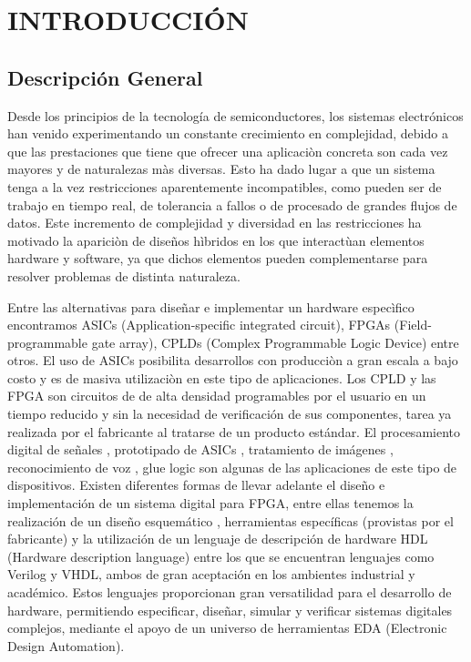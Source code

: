 \chapter{INTRODUCCIÓN}


\section{Descripción General}

Desde los principios de la tecnología de semiconductores, los sistemas
electrónicos han venido experimentando un constante crecimiento en complejidad,
debido a que las prestaciones que tiene que ofrecer una aplicaciòn concreta son
cada vez mayores y de naturalezas màs diversas. Esto ha dado lugar a que un
sistema  tenga a la vez restricciones aparentemente incompatibles, como pueden
ser de trabajo en tiempo real, de tolerancia a fallos o de procesado de grandes
flujos de datos. Este incremento de complejidad y diversidad en las
restricciones ha motivado la apariciòn de diseños hìbridos en los que
interactùan elementos hardware y software, ya que dichos elementos pueden
complementarse para resolver problemas de distinta naturaleza.


Entre las alternativas para diseñar e implementar un hardware especìfico
encontramos ASICs  (Application-specific integrated circuit), FPGAs
(Field-programmable gate array), CPLDs (Complex Programmable Logic Device)
entre otros. El uso de ASICs posibilita desarrollos con producciòn a gran
escala a bajo costo y es de masiva utilizaciòn en este tipo de aplicaciones.
Los  CPLD  y las FPGA son circuitos de de alta densidad programables por el
usuario en un tiempo reducido y sin la necesidad de verificación de sus
componentes, tarea ya realizada por el fabricante al tratarse de un producto
estándar. El procesamiento digital de señales , prototipado de ASICs ,
tratamiento de imágenes , reconocimiento de voz , glue logic son algunas de las
aplicaciones de este tipo de dispositivos. Existen diferentes formas de llevar
adelante el diseño e implementación de un sistema digital para FPGA, entre
ellas tenemos la realización de un diseño esquemático , herramientas
específicas (provistas por el fabricante) y la utilización de un lenguaje de
descripción de hardware HDL (Hardware description language) entre los que  se
encuentran lenguajes como Verilog y VHDL, ambos de gran aceptación en los
ambientes industrial y académico. Estos lenguajes proporcionan gran
versatilidad para el desarrollo de hardware, permitiendo especificar, diseñar,
simular y verificar sistemas digitales complejos, mediante el apoyo de un
universo de herramientas EDA (Electronic Design Automation).

